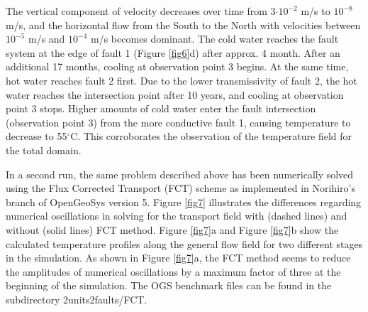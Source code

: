 The vertical component of velocity decreases over time from 3$\cdot10^{-2}$ m/s to $10^{-8}$ m/s, and the horizontal flow from the South to the North with velocities between $10^{-5}$ m/s and $10^{-4}$ m/s becomes dominant. The cold water reaches the fault system at the edge of fault 1 (Figure \ref{fig6}d) after approx. 4 month. After an additional 17 months, cooling at observation point 3 begins. At the same time, hot water reaches fault 2 first. Due to the lower transmissivity of fault 2, the hot water reaches the intersection point after 10 years, and cooling at observation point 3 stops. Higher amounts of cold water enter the fault intersection (observation point 3) from the more conductive fault 1, causing temperature to decrease to 55$^\circ{}$C. This corroborates the observation of the temperature field for the total domain.

In a second run, the same problem described above has been numerically solved using the Flux Corrected Transport (FCT) scheme as implemented in Norihiro's branch of OpenGeoSys version 5. Figure \ref{fig7} illustrates the differences regarding numerical oscillations in solving for the transport field with (dashed lines) and without (solid lines) FCT method. Figure \ref{fig7}a and Figure \ref{fig7}b show the calculated temperature profiles along the general flow field for two different stages in the simulation. As shown in Figure \ref{fig7}a, the FCT method seems to reduce the amplitudes of numerical oscillations by a maximum factor of three at the beginning of the simulation. The OGS benchmark files can be found in the subdirectory 2units2faults/FCT.
 
